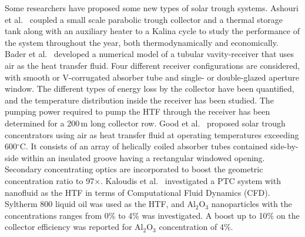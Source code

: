 Some researchers have proposed some new types of solar trough systems.
Ashouri et al.~\cite{Ashouri2015} coupled a small scale parabolic trough collector and a thermal storage tank along with an auxiliary heater to a Kalina cycle to study the performance of the system throughout the year, both thermodynamically and economically.
Bader et al.~\cite{Bader2015} developed a numerical model of a tubular vavity-receiver that uses air as the heat transfer fluid. Four different receiver configurations are considered, with smooth or V-corrugated absorber tube and single- or double-glazed aperture window. The different types of energy loss by the collector have been quantified, and the temperature distribution inside the receiver has been studied. The pumping power required to pump the HTF through the receiver has been determined for a 200$\,\mathrm{m}$ long collector row.
Good et al.~\cite{Good2015} proposed solar trough concentrators using air as heat transfer fluid at operating temperatures exceeding 600$\mathrm{^\circ C}$. It consists of an array of helically coiled absorber tubes contained side-by-side within an insulated groove having a rectangular windowed opening. Secondary concentrating optics are incorporated to boost the geometric concentration ratio to 97$\times$.
Kaloudis et al.~\cite{Kaloudis2016} investigated a PTC system with nanofluid as the HTF in terms of Computational Fluid Dynamics (CFD). Syltherm 800 liquid oil was used as the HTF, and Al$_2$O$_3$ nanoparticles with the concentrations ranges from 0\% to 4\% was investigated. A boost up to 10\% on the collector efficiency was reported for Al$_2$O$_3$ concentration of 4\%.
